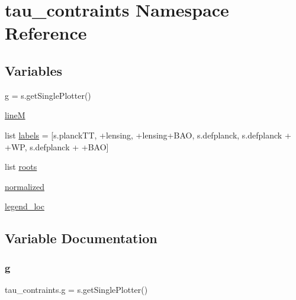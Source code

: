 \hypertarget{namespacetau__contraints}{}\section{tau\+\_\+contraints Namespace Reference}
\label{namespacetau__contraints}
\subsection*{Variables}
\begin{DoxyCompactItemize}
\item 
\mbox{\hyperlink{namespacetau__contraints_ae8e6630fd8b51c9d1a71049d041840df}{g}} = s.\+get\+Single\+Plotter()
\item 
\mbox{\hyperlink{namespacetau__contraints_ab65b5dcda5271f26234e9e0d2545569b}{lineM}}
\item 
list \mbox{\hyperlink{namespacetau__contraints_ad74f7e149ec627865e42d06824fa4fb4}{labels}} = \mbox{[}s.\+planck\+TT, \textquotesingle{}+lensing\textquotesingle{}, \textquotesingle{}+lensing+B\+AO\textquotesingle{}, s.\+defplanck, s.\+defplanck + \textquotesingle{}+WP\textquotesingle{}, s.\+defplanck + \textquotesingle{}+B\+AO\textquotesingle{}\mbox{]}
\item 
list \mbox{\hyperlink{namespacetau__contraints_ac57e6f388a5512fea898aa7c7a97cf3b}{roots}}
\item 
\mbox{\hyperlink{namespacetau__contraints_a0a28233112f8add50c260ef6a084c1bb}{normalized}}
\item 
\mbox{\hyperlink{namespacetau__contraints_a6665b16b68644b11821e1cfba75a1ce4}{legend\+\_\+loc}}
\end{DoxyCompactItemize}


\subsection{Variable Documentation}
\mbox{\label{namespacetau__contraints_ae8e6630fd8b51c9d1a71049d041840df}} 
\subsubsection{\texorpdfstring{g}{g}}
{\footnotesize\ttfamily tau\+\_\+contraints.\+g = s.\+get\+Single\+Plotter()}

\mbox{\label{namespacetau__contraints_ad74f7e149ec627865e42d06824fa4fb4}} 
